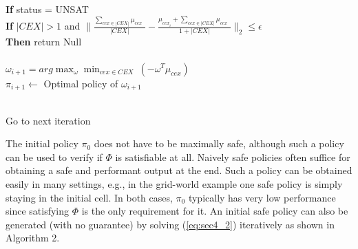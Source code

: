 \begin{algorithm}[htb]
\begin{algorithmic}[1]
\\\qquad\qquad \textbf{If} status = UNSAT
\\\qquad\qquad\qquad \textbf{If} $|CEX|>1$ and $\|\frac{\underset{cex \in |CEX|}{\sum}\mu_{cex}\ \ }{|CEX|}-\frac{\mu_{cex_i} + \underset{cex \in |CEX|}{\sum}\mu_{cex}\ \ }{1 + |CEX|}\|_2\leq\epsilon$
\\\qquad\qquad\qquad\qquad  \textbf{Then} return Null\\
\\\qquad\qquad $\omega_{i+1} = arg\max_{\omega} \min_{cex\in CEX}\ (-\omega^T\mu_{cex})$
\\\qquad\qquad $\pi_{i+1}\gets$ Optimal policy of $\omega_{i+1}$

\\\qquad Go to next iteration

\end{algorithmic}
\end{algorithm}

\begin{remark}
The initial policy $\pi_0$ does not have to be maximally safe, although such a policy can be used to verify if $\Phi$ is  satisfiable at all. 
Naively safe policies often suffice for obtaining a safe and performant output at the end. Such a policy can be obtained easily in many settings, e.g., in the grid-world example one safe policy is simply staying in the initial cell. 
In both cases, $\pi_0$ typically has very low performance since satisfying $\Phi$ is the only requirement for it. An initial safe policy can also be generated (with no guarantee) by solving (\ref{eq:sec4_2}) iteratively as shown in Algorithm 2.
\end{remark}

